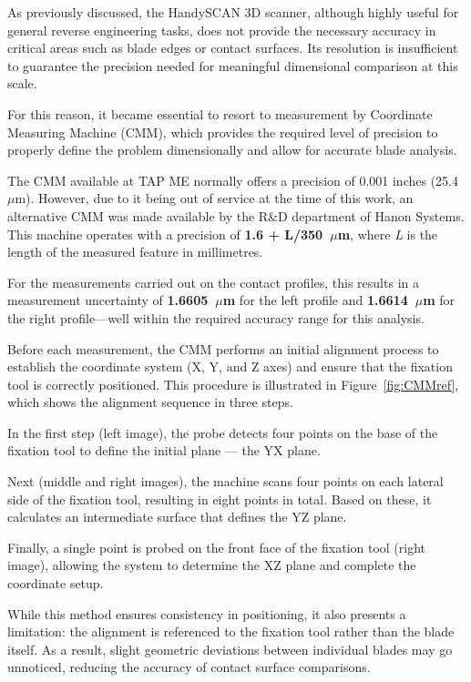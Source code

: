 As previously discussed, the HandySCAN 3D scanner, although highly useful for general reverse engineering tasks, does not provide the necessary accuracy in critical areas such as blade edges or contact surfaces. Its resolution is insufficient to guarantee the precision needed for meaningful dimensional comparison at this scale.

For this reason, it became essential to resort to measurement by Coordinate Measuring Machine (CMM), which provides the required level of precision to properly define the problem dimensionally and allow for accurate blade analysis.

The CMM available at TAP ME normally offers a precision of 0.001 inches (25.4~$\mu$m). However, due to it being out of service at the time of this work, an alternative CMM was made available by the R\&D department of Hanon Systems. This machine operates with a precision of \textbf{1.6 + L/350~$\mu$m}, where \textit{L} is the length of the measured feature in millimetres.

For the measurements carried out on the contact profiles, this results in a measurement uncertainty of \textbf{1.6605~$\mu$m} for the left profile and \textbf{1.6614~$\mu$m} for the right profile---well within the required accuracy range for this analysis.


Before each measurement, the CMM performs an initial alignment process to establish the coordinate system (X, Y, and Z axes) and ensure that the fixation tool is correctly positioned. This procedure is illustrated in Figure~\ref{fig:CMMref}, which shows the alignment sequence in three steps.

In the first step (left image), the probe detects four points on the base of the fixation tool to define the initial plane — the YX plane.

Next (middle and right images), the machine scans four points on each lateral side of the fixation tool, resulting in eight points in total. Based on these, it calculates an intermediate surface that defines the YZ plane.

Finally, a single point is probed on the front face of the fixation tool (right image), allowing the system to determine the XZ plane and complete the coordinate setup.

While this method ensures consistency in positioning, it also presents a limitation: the alignment is referenced to the fixation tool rather than the blade itself. As a result, slight geometric deviations between individual blades may go unnoticed, reducing the accuracy of contact surface comparisons.


